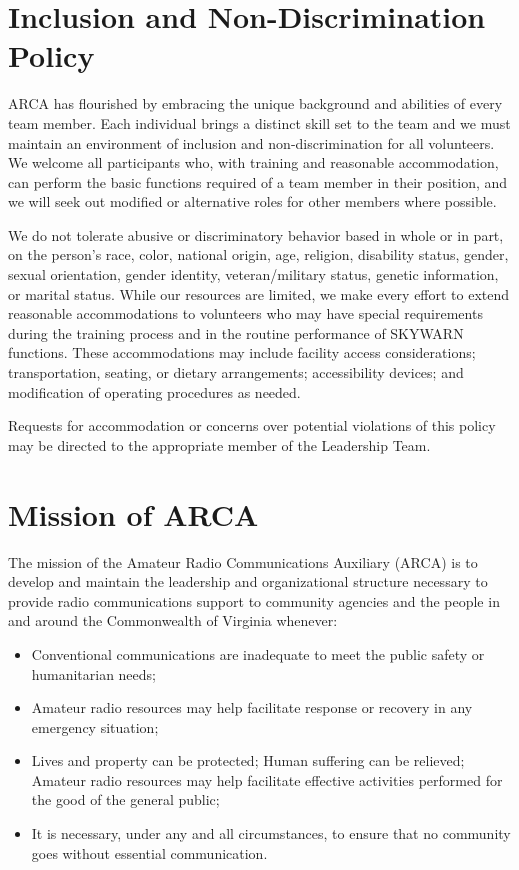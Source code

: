 \documentclass[pdflatex,letterpaper,twoside,12pt]{book}
\begin{document}
\section{Inclusion and Non-Discrimination Policy}

ARCA has flourished by embracing the unique background and abilities of every team member.  Each individual brings a distinct skill set to the team and we must maintain an environment of inclusion and non-discrimination for all volunteers.  We welcome all participants who, with training and reasonable accommodation, can perform the basic functions required of a team member in their position, and we will seek out modified or alternative roles for other members where possible.

We do not tolerate abusive or discriminatory behavior based in whole or in part, on the person's race, color, national origin, age, religion, disability status, gender, sexual orientation, gender identity, veteran/military status, genetic information, or marital status.  While our resources are limited, we make every effort to extend reasonable accommodations to volunteers who may have special requirements during the training process and in the routine performance of SKYWARN functions.  These accommodations may include facility access considerations; transportation, seating, or dietary arrangements; accessibility devices; and modification of operating procedures as needed.

Requests for accommodation or concerns over potential violations of this policy may be directed to the appropriate member of the Leadership Team.


\section{Mission of ARCA}

The mission of the Amateur Radio Communications Auxiliary (ARCA) is to develop and maintain the leadership and organizational structure necessary to provide radio communications support to community agencies and the people in and around the Commonwealth of Virginia whenever:

\begin{itemize}
	\item Conventional communications are inadequate to meet the public safety or humanitarian needs;
	\item Amateur radio resources may help facilitate response or recovery in any emergency situation;  
	\item Lives and property can be protected; Human suffering can be relieved; Amateur radio resources may help facilitate effective activities performed for the good of the general public;  
	\item It is necessary, under any and all circumstances, to ensure that no community goes without essential communication.
\end{itemize}
\end{document}
